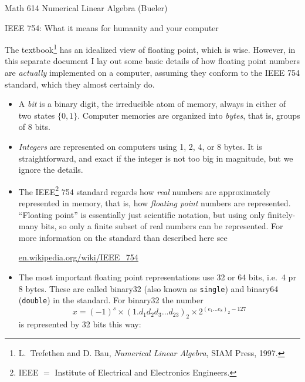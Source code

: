 \documentclass[11pt]{amsart}
\begin{document}
\scriptsize \noindent Math 614 Numerical Linear Algebra (Bueler) \hfill {}
\normalsize

\medskip\bigskip
\LARGE\centerline{IEEE 754: What it means for humanity and your computer}

\bigskip
\normalsize

\thispagestyle{empty}

The textbook\footnote{L.~Trefethen and D. Bau, \emph{Numerical Linear Algebra}, SIAM Press, 1997.} has an idealized view of floating point, which is wise.  However, in this separate document I lay out some basic details of how floating point numbers are \emph{actually} implemented on a computer, assuming they conform to the IEEE 754 standard, which they almost certainly do.

\bigskip
\begin{itemize}
\setlength\itemsep{1em}
\item A \emph{bit} is a binary digit, the irreducible atom of memory, always in either of two states $\{0,1\}$.  Computer memories are organized into \emph{bytes}, that is, groups of 8 bits.

\item \emph{Integers} are represented on computers using 1, 2, 4, or 8 bytes.  It is straightforward, and exact if the integer is not too big in magnitude, but we ignore the details.

\item The IEEE\footnote{IEEE $=$ Institute of Electrical and Electronics Engineers.} 754 standard regards how \emph{real} numbers are approximately represented in memory, that is, how \emph{floating point} numbers are represented.  ``Floating point'' is essentially just scientific notation, but using only finitely-many bits, so only a finite subset of real numbers can be represented.    For more information on the standard than described here see

 \centerline{\url{en.wikipedia.org/wiki/IEEE_754}}


\item The most important floating point representations use 32 or 64 bits, i.e.~4 pr 8 bytes.  These are called binary32 (also known as \texttt{single}) and binary64 (\texttt{double}) in the standard.  For binary32 the number
       $$x = (-1)^s \times \left(1.d_1 d_2 d_3 \dots d_{23}\right)_{2} \times 2^{\left(e_1\dots e_8\right)_2 - 127}$$
is represented by 32 bits this way:

\medskip
\hspace{-30mm}


\end{itemize}
\end{document}
